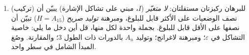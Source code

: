 \begin{problem}
\begin{enumerate}[resume]
        (القطع $15, 14, \dots, 1$ في الخانات $1$
        إلى $15$، والفراغ في موطنه)، واللوحة التي فيها الفراغ في
        الخانة $1$ تتلوه القطع $15, 14, \dots, 1$ في الخانات $2$
        إلى $16$. أيهما قابلة للحلّ؟
  \item (تركيب) للبرهان ركيزتان مستقلتان: \emph{لا متغيّر}
        ($I$، مبني على تشاكل الإشارة)
        يبيّن أن نصف الوضعيات على الأكثر قابل للبلوغ،
        ومبرهنة \emph{توليد صريح} ($H = A_{15}$)
        تبيّن أن نصفها على الأقل قابل للبلوغ. بجملة واحدة لكل
        منها، قل أين دخل ما يلي: خاصية التشاكل في
        $\varepsilon$؛ ومبرهنة لاغرانج؛ وتوليد $A_n$
        بالدورات ذات الطول $3$؛ والمقارنة. وصُغ المبدأ الشامل في
        سطر واحد.
\end{enumerate}
\end{problem}

